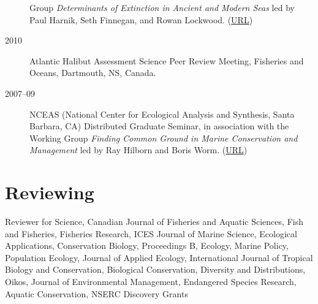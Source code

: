 \begin{description}
Group \emph{Determinants of Extinction in Ancient and Modern Seas} led
by Paul Harnik, Seth Finnegan, and Rowan Lockwood.
(\href{http://www.nescent.org/science/awards_summary.php?id=256}{URL})
\item[2010]
Atlantic Halibut Assessment Science Peer Review Meeting, Fisheries and
Oceans, Dartmouth, NS, Canada.
\item[2007--09]
NCEAS (National Center for Ecological Analysis and Synthesis, Santa
Barbara, CA) Distributed Graduate Seminar, in association with the
Working Group \emph{Finding Common Ground in Marine Conservation and
Management} led by Ray Hilborn and Boris Worm.
(\href{http://www.nceas.ucsb.edu/projects/12307}{URL})
\end{description}

\section{Reviewing}\label{reviewing}

Reviewer for Science, Canadian Journal of Fisheries and Aquatic
Sciences, Fish and Fisheries, Fisheries Research, ICES Journal of Marine
Science, Ecological Applications, Conservation Biology, Proceedings B,
Ecology, Marine Policy, Population Ecology, Journal of Applied Ecology,
International Journal of Tropical Biology and Conservation, Biological
Conservation, Diversity and Distributions, Oikos, Journal of
Environmental Management, Endangered Species Research, Aquatic
Conservation, NSERC Discovery Grants
